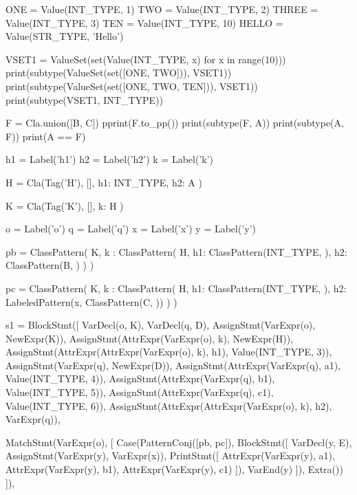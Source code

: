\begin{dispPy}
    ONE = Value(INT_TYPE, 1)
    TWO = Value(INT_TYPE, 2)
    THREE = Value(INT_TYPE, 3)
    TEN = Value(INT_TYPE, 10)
    HELLO = Value(STR_TYPE, 'Hello')

    VSET1 = ValueSet(set(Value(INT_TYPE, x) for x in range(10)))
    print(subtype(ValueSet(set([ONE, TWO])), VSET1))
    print(subtype(ValueSet(set([ONE, TWO, TEN])), VSET1))
    print(subtype(VSET1, INT_TYPE))

    F = Cla.union([B, C])
    pprint(F.to_pp())
    print(subtype(F, A))
    print(subtype(A, F))
    print(A == F)

    h1 = Label('h1')
    h2 = Label('h2')
    k = Label('k')

    H = Cla(Tag('H'),
        [],
        {
            h1: INT_TYPE,
            h2: A
        })

    K = Cla(Tag('K'),
        [],
        {
            k: H
        })

    o = Label('o')
    q = Label('q')
    x = Label('x')
    y = Label('y')

    pb = ClassPattern(
        K,
        {
            k : ClassPattern(
                H,
                {
                    h1: ClassPattern(INT_TYPE, {}),
                    h2: ClassPattern(B, {})
                })
        })

    pc = ClassPattern(
        K,
        {
            k : ClassPattern(
                H,
                {
                    h1: ClassPattern(INT_TYPE, {}),
                    h2: LabeledPattern(x, ClassPattern(C, {}))
                })
        })

    s1 = BlockStmt([
        VarDecl(o, K),
        VarDecl(q, D),
        AssignStmt(VarExpr(o), NewExpr(K)),
        AssignStmt(AttrExpr(VarExpr(o), k), NewExpr(H)),
        AssignStmt(AttrExpr(AttrExpr(VarExpr(o), k), h1), Value(INT_TYPE, 3)),
        AssignStmt(VarExpr(q), NewExpr(D)),
        AssignStmt(AttrExpr(VarExpr(q), a1), Value(INT_TYPE, 4)),
        AssignStmt(AttrExpr(VarExpr(q), b1), Value(INT_TYPE, 5)),
        AssignStmt(AttrExpr(VarExpr(q), c1), Value(INT_TYPE, 6)),
        AssignStmt(AttrExpr(AttrExpr(VarExpr(o), k), h2), VarExpr(q)),

        MatchStmt(VarExpr(o), [
            Case(PatternConj([pb, pc]), BlockStmt([
                VarDecl(y, E),
                AssignStmt(VarExpr(y), VarExpr(x)),
                PrintStmt([
                    AttrExpr(VarExpr(y), a1),
                    AttrExpr(VarExpr(y), b1),
                    AttrExpr(VarExpr(y), c1)
                    ]),
                VarEnd(y)
                ]), Extra())
            ]),


\end{dispPy}
